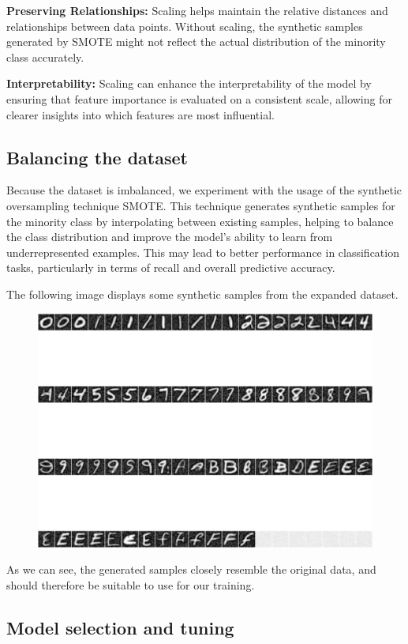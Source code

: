 \documentclass{article}
\begin{document}
\textbf{Preserving Relationships:} Scaling helps maintain the relative distances and relationships between data points. Without scaling, the synthetic samples generated by SMOTE might not reflect the actual distribution of the minority class accurately.

\textbf{Interpretability:} Scaling can enhance the interpretability of the model by ensuring that feature importance is evaluated on a consistent scale, allowing for clearer insights into which features are most influential.


\subsection{Balancing the dataset}

Because the dataset is imbalanced, we experiment with the usage of the synthetic oversampling technique SMOTE. This technique generates synthetic samples for the minority class by interpolating between existing samples, helping  to balance the class distribution and improve the model's ability to learn from underrepresented examples. This may lead to better performance in classification tasks, particularly in terms of recall and overall predictive accuracy.

The following image displays some synthetic samples from the expanded dataset.

\begin{figure}[H]
    \centering
    \includegraphics[width=0.75\linewidth]{smote_pics.png}
\end{figure}

As we can see, the generated samples closely resemble the original data, and should therefore be suitable to use for our training.

\subsection{Model selection and tuning}
\end{document}
